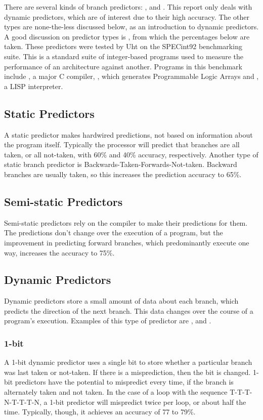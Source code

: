 There are several kinds of branch predictors: ,  and
. This report only deals with dynamic predictors, which are of
interest due to their high accuracy. The other types are none-the-less discussed
below, as an introduction to dynamic predictors. A good discussion on predictor
types is \cite{Uht97}, from which the percentages below are taken. These
predictors were tested by Uht on the SPECint92 benchmarking suite. This is a
standard suite of integer-based programs used to measure the performance of an
architecture against another. Programs in this benchmark include , a
major C compiler, , which generates Programmable Logic Arrays and
, a LISP interpreter.

\subsection{Static Predictors}
A static predictor makes hardwired predictions, not based on information about
the program itself. Typically the processor will predict that branches are all
taken, or all not-taken, with 60\% and 40\% accuracy, respectively. Another type
of static branch predictor is Backwards-Taken-Forwards-Not-taken. Backward
branches are usually taken, so this increases the prediction accuracy to 65\%.

\subsection{Semi-static Predictors}
Semi-static predictors rely on the compiler to make their predictions for them.
The predictions don't change over the execution of a program, but the
improvement in predicting forward branches, which predominantly execute one way,
increases the accuracy to 75\%.

\subsection{Dynamic Predictors}
Dynamic predictors store a small amount of data about each branch, which
predicts the direction of the next branch. This data changes over the course of
a program's execution. Examples of this type of predictor are ,
 and .

\subsubsection{1-bit}
A 1-bit dynamic predictor uses a single bit to store whether a particular branch was last
taken or not-taken.  If there is a misprediction, then the bit is changed. 1-bit
predictors have the potential to mispredict every time, if the branch is
alternately taken and not taken. In the case of a loop with the sequence
T-T-T-N-T-T-T-N, a 1-bit predictor will mispredict twice per loop, or about half
the time.  Typically, though, it achieves an accuracy of 77 to 79\%.

